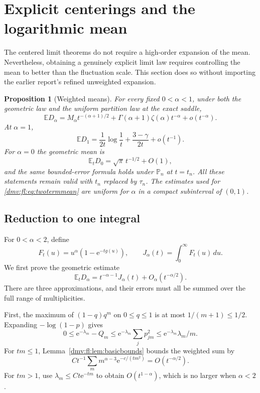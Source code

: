 \documentclass[11pt,letterpaper]{article}
\numberwithin{equation}{section}
\newtheorem{proposition}[theorem]{Proposition}
\theoremstyle{definition}\newtheorem{definition}[theorem]{Definition}
\theoremstyle{remark}\newtheorem{remark}[theorem]{Remark}
\newcommand{\E}{\mathbb E}
\newcommand{\ee}{\mathrm e}
\newcommand{\Pp}{\mathbb P}
\begin{document}
\section{Explicit centerings and the logarithmic mean}\label{dmv:fl:sec:means}

The centered limit theorems do not require a high-order expansion of
the mean. Nevertheless, obtaining a genuinely explicit limit law
requires controlling the mean to better than the fluctuation scale.
This section does so without importing the earlier report's refined
unweighted expansion.

\begin{proposition}[Weighted means]\label{dmv:fl:prop:weightedmeans}
For every fixed $0<\alpha<1$, under both the geometric law and the
uniform partition law at the exact saddle,
\begin{equation}\label{dmv:fl:eq:twotermmean}
 \E D_\alpha=M_\alpha t^{-(\alpha+1)/2}
       +\Gamma(\alpha+1)\zeta(\alpha)t^{-\alpha}
       +o(t^{-\alpha}).
\end{equation}
At $\alpha=1$,
\begin{equation}\label{dmv:fl:eq:onemean}
 \E D_1=\frac1{2t}\log\frac1t+\frac{3-\gamma}{2t}+o(t^{-1}).
\end{equation}
For $\alpha=0$ the geometric mean is
\begin{equation}\label{dmv:fl:eq:zeromean}
 \E_tD_0=\sqrt\pi\,t^{-1/2}+O(1),
\end{equation}
and the same bounded-error formula holds under $\Pp_n$ at $t=t_n$.
All these statements remain valid with $t_n$ replaced by $\tau_n$.
The estimates used for \eqref{dmv:fl:eq:twotermmean} are uniform for $\alpha$
in a compact subinterval of $(0,1)$.
\end{proposition}

\subsection{Reduction to one integral}
For $0<\alpha<2$, define
\[
 F_t(u)=u^\alpha(1-\ee^{-tg(u)}),\qquad
 J_\alpha(t)=\int_0^\infty F_t(u)\,du.
\]
We first prove the geometric estimate
\begin{equation}\label{dmv:fl:eq:meanintegral}
 \E_tD_\alpha=t^{-\alpha-1}J_\alpha(t)+O_\alpha(t^{-\alpha/2}).
\end{equation}
There are three approximations, and their errors must all be summed
over the full range of multiplicities.

First, the maximum of $(1-q)q^m$ on $0\le q\le1$ is at most
$1/(m+1)\le1/2$. Expanding $-\log(1-p)$ gives
\begin{equation}\label{dmv:fl:eq:poissonerror}
 0\le\ee^{-\lambda_m}-Q_m
 \le\ee^{-\lambda_m}\sum_jp_{jm}^2
 \le\ee^{-\lambda_m}\lambda_m/m.
\end{equation}
For $tm\le1$, Lemma~\ref{dmv:fl:lem:basicbounds} bounds the weighted sum by
\[
 Ct^{-1}\sum_m m^{\alpha-3}\ee^{-c/(tm^2)}=O(t^{-\alpha/2}).
\]
For $tm>1$, use $\lambda_m\le Ct\ee^{-tm}$ to obtain
$O(t^{1-\alpha})$, which is no larger when $\alpha<2$.
\end{document}
